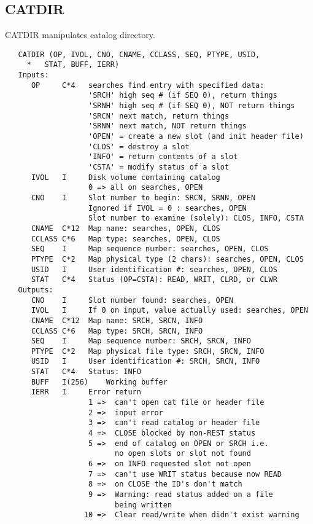 \subsection{CATDIR}
CATDIR manipulates catalog directory.
\begin{verbatim}
   CATDIR (OP, IVOL, CNO, CNAME, CCLASS, SEQ, PTYPE, USID,
     *   STAT, BUFF, IERR)
   Inputs:
      OP     C*4   searches find entry with specified data:
                   'SRCH' high seq # (if SEQ 0), return things
                   'SRNH' high seq # (if SEQ 0), NOT return things
                   'SRCN' next match, return things
                   'SRNN' next match, NOT return things
                   'OPEN' = create a new slot (and init header file)
                   'CLOS' = destroy a slot
                   'INFO' = return contents of a slot
                   'CSTA' = modify status of a slot
      IVOL   I     Disk volume containing catalog
                   0 => all on searches, OPEN
      CNO    I     Slot number to begin: SRCN, SRNN, OPEN
                   Ignored if IVOL = 0 : searches, OPEN
                   Slot number to examine (solely): CLOS, INFO, CSTA
      CNAME  C*12  Map name: searches, OPEN, CLOS
      CCLASS C*6   Map type: searches, OPEN, CLOS
      SEQ    I     Map sequence number: searches, OPEN, CLOS
      PTYPE  C*2   Map physical type (2 chars): searches, OPEN, CLOS
      USID   I     User identification #: searches, OPEN, CLOS
      STAT   C*4   Status (OP=CSTA): READ, WRIT, CLRD, or CLWR
   Outputs:
      CNO    I     Slot number found: searches, OPEN
      IVOL   I     If 0 on input, value actually used: searches, OPEN
      CNAME  C*12  Map name: SRCH, SRCN, INFO
      CCLASS C*6   Map type: SRCH, SRCN, INFO
      SEQ    I     Map sequence number: SRCH, SRCN, INFO
      PTYPE  C*2   Map physical file type: SRCH, SRCN, INFO
      USID   I     User identification #: SRCH, SRCN, INFO
      STAT   C*4   Status: INFO
      BUFF   I(256)    Working buffer
      IERR   I     Error return
                   1 =>  can't open cat file or header file
                   2 =>  input error
                   3 =>  can't read catalog or header file
                   4 =>  CLOSE blocked by non-REST status
                   5 =>  end of catalog on OPEN or SRCH i.e.
                         no open slots or slot not found
                   6 =>  on INFO requested slot not open
                   7 =>  can't use WRIT status because now READ
                   8 =>  on CLOSE the ID's don't match
                   9 =>  Warning: read status added on a file
                         being written
                  10 =>  Clear read/write when didn't exist warning
\end{verbatim}

